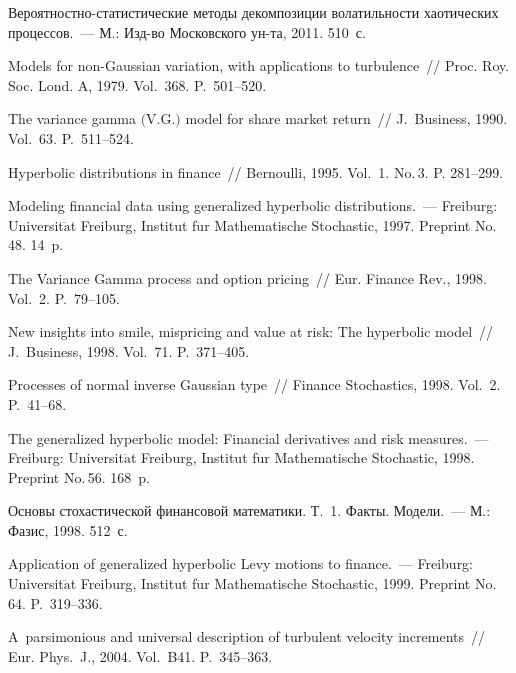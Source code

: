 \begin{multicols}{2}
{{\begin{thebibliography}{99}
 Ве\-ро\-ят\-ност\-но-ста\-ти\-сти\-че\-ские методы декомпозиции
волатильности хаотических процессов.~--- М.: Изд-во Московского
ун-та, 2011. 510~с.

 Models for non-Gaussian variation,
with applications to turbulence~// Proc. Roy. Soc. Lond. A,
1979. Vol.~368. P.~501--520.

 The variance gamma $($V.G.$)$ model
for share market return~// J.~Business, 1990. Vol.~63. P.~511--524.

 Hyperbolic distributions in finance~//
Bernoulli, 1995. Vol.~1. No.\,3. P. 281--299.

 Modeling financial data using generalized hyperbolic
distributions.~--- Freiburg: Universit$\ddot{\mbox{a}}$t Freiburg, Institut
f$\ddot{\mbox{u}}$r Mathematische Stochastic, 1997. Preprint No.\,48. 14~p.

 The Variance Gamma
process and option pricing~// Eur. Finance Rev., 1998. Vol.~2.
P.~79--105.

 New insights into smile,
mispricing and value at risk: The hyperbolic model~// J.~Business, 1998. Vol.~71. P.~371--405.

 Processes of normal inverse Gaussian
type~// Finance Stochastics, 1998. Vol.~2. P.~41--68.

 The generalized hyperbolic model:
Financial derivatives and risk measures.~--- Freiburg:
Universit$\ddot{\mbox{a}}$t Freiburg, Institut f$\ddot{\mbox{u}}$r 
Mathematische Stochastic, 1998. Preprint No.\,56. 168~p.

 Основы стохастической финансовой математики. Т.~1. Факты. Модели.~--- 
М.: Фазис, 1998. 512~с.

 Application of generalized hyperbolic Levy
motions to finance.~--- Freiburg: Universit$\ddot{\mbox{a}}$t Freiburg, Institut
f$\ddot{\mbox{u}}$r Mathematische Stochastic, 1999. Preprint No.\,64. P.~319--336.

A~parsimonious and universal description of turbulent velocity
increments~// Eur. Phys.~J., 2004. Vol.~B41. P.~345--363.


\end{thebibliography}}}
\end{multicols}
